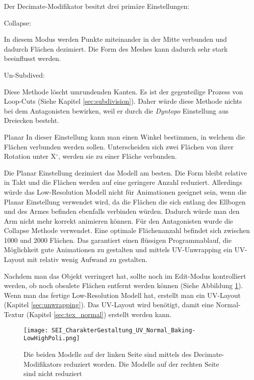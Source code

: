 Der Decimate-Modifikator besitzt drei primäre Einstellungen:

Collapse:

In diesem Modus werden Punkte miteinander in der Mitte verbunden und dadurch Flächen dezimiert. Die Form des Meshes
kann dadurch sehr stark beeinflusst werden.

Un-Subdived:

Diese Methode löscht umrundenden Kanten. Es ist der gegenteilige Prozess von Loop-Cuts (Siehe Kapitel \ref{sec:subdivision}).
Daher würde diese Methode nichts bei dem Antagonisten bewirken, weil er durch die \textit{Dyntopo} Einstellung aus
Dreiecken besteht.

Planar
In dieser Einstellung kann man einen Winkel bestimmen, in welchem die Flächen verbunden werden sollen.
Unterscheiden sich zwei Flächen von ihrer Rotation unter X$^\circ$, werden sie zu einer Fläche verbunden.


Die Planar Einstellung dezimiert das Modell am besten. Die Form bleibt relative in Takt und die Flächen werden auf eine
geringere Anzahl reduziert. Allerdings würde das Low-Resolution Modell nicht für Animationen geeignet sein, wenn die
Planar Einstellung verwendet wird, da die Flächen die sich entlang des Ellbogen und des Armes befinden ebenfalls
verbinden würden. Dadurch würde man den Arm nicht mehr korrekt animieren können. Für den Antagonisten wurde die
Collapse Methode verwendet. Eine optimale Flächenanzahl befindet sich zwischen 1000 und 2000 Flächen. Das garantiert
einen flüssigen Programmablauf, die Möglichkeit gute Animationen zu gestalten und mittels UV-Unwrapping ein UV-Layout
mit relativ wenig Aufwand zu gestalten.

Nachdem man das Objekt verringert hat, sollte noch im Edit-Modus kontrolliert werden, ob noch obsulete Flächen entfernt
werden können (Siehe Abbildung \ref{picture:antagonist_decimated}). Wenn man das fertige Low-Resolution Modell hat,
erstellt man ein UV-Layout (Kapitel \ref{sec:unwrapping}).
Das UV-Layout wird benötigt, damit eine Normal-Textur (Kapitel \ref{sec:tex_normal}) erstellt werden kann.

\begin{figure}[H]
    \centering
    \texttt{[image: SEI\_CharakterGestaltung\_UV\_Normal\_Baking-LowHighPoli.png]}
    \caption{Die beiden Modelle auf der linken Seite sind mittels des Decimate-Modifikators reduziert worden. Die Modelle auf der rechten Seite sind nicht reduziert}
    \label{picture:antagonist_decimated}
\end{figure}



